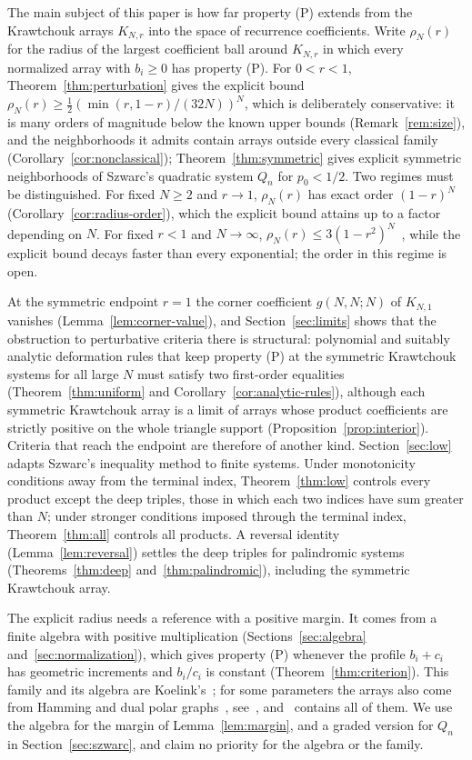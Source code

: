 The main subject of this paper is how far property (P) extends from the Krawtchouk arrays $K_{N,r}$ into the space of recurrence coefficients. Write $\rho_N(r)$ for the radius of the largest coefficient ball around $K_{N,r}$ in which every normalized array with $b_i\geq0$ has property (P). For $0<r<1$, Theorem~\ref{thm:perturbation} gives the explicit bound $\rho_N(r)\geq\frac12(\min(r,1-r)/(32N))^N$, which is deliberately conservative: it is many orders of magnitude below the known upper bounds (Remark~\ref{rem:size}), and the neighborhoods it admits contain arrays outside every classical family (Corollary~\ref{cor:nonclassical}); Theorem~\ref{thm:symmetric} gives explicit symmetric neighborhoods of Szwarc's quadratic system $Q_n$ for $p_0<1/2$. Two regimes must be distinguished. For fixed $N\geq2$ and $r\to1$, $\rho_N(r)$ has exact order $(1-r)^N$ (Corollary~\ref{cor:radius-order}), which the explicit bound attains up to a factor depending on $N$. For fixed $r<1$ and $N\to\infty$, $\rho_N(r)\leq3(1-r^2)^N$~\cite[Corollary~]{P1}, while the explicit bound decays faster than every exponential; the order in this regime is open.

At the symmetric endpoint $r=1$ the corner coefficient $g(N,N;N)$ of $K_{N,1}$ vanishes (Lemma~\ref{lem:corner-value}), and Section~\ref{sec:limits} shows that the obstruction to perturbative criteria there is structural: polynomial and suitably analytic deformation rules that keep property (P) at the symmetric Krawtchouk systems for all large $N$ must satisfy two first-order equalities (Theorem~\ref{thm:uniform} and Corollary~\ref{cor:analytic-rules}), although each symmetric Krawtchouk array is a limit of arrays whose product coefficients are strictly positive on the whole triangle support (Proposition~\ref{prop:interior}). Criteria that reach the endpoint are therefore of another kind. Section~\ref{sec:low} adapts Szwarc's inequality method to finite systems. Under monotonicity conditions away from the terminal index, Theorem~\ref{thm:low} controls every product except the deep triples, those in which each two indices have sum greater than $N$; under stronger conditions imposed through the terminal index, Theorem~\ref{thm:all} controls all products. A reversal identity (Lemma~\ref{lem:reversal}) settles the deep triples for palindromic systems (Theorems~\ref{thm:deep} and~\ref{thm:palindromic}), including the symmetric Krawtchouk array.

The explicit radius needs a reference with a positive margin. It comes from a finite algebra with positive multiplication (Sections~\ref{sec:algebra} and~\ref{sec:normalization}), which gives property (P) whenever the profile $b_i+c_i$ has geometric increments and $b_i/c_i$ is constant (Theorem~\ref{thm:criterion}). This family and its algebra are Koelink's~\cite[Theorems~3.1(ii) and 7.8]{koelink}; for some parameters the arrays also come from Hamming and dual polar graphs~\cite{bcn,vdkt}, see~\cite[Section~]{P1}, and~\cite[Theorem~]{P1} contains all of them. We use the algebra for the margin of Lemma~\ref{lem:margin}, and a graded version for $Q_n$ in Section~\ref{sec:szwarc}, and claim no priority for the algebra or the family.

